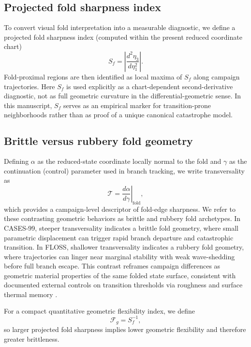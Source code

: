 \documentclass[12pt,a4paper]{article}
\begin{document}
\subsection{Projected fold sharpness index}

To convert visual fold interpretation into a measurable diagnostic, we define a projected fold sharpness index (computed within the present reduced coordinate chart)
\begin{equation}
S_f = \left|\frac{d^2\eta_3}{d\eta_1^2}\right|.
\end{equation}
Fold-proximal regions are then identified as local maxima of $S_f$ along campaign trajectories. Here $S_f$ is used explicitly as a chart-dependent second-derivative diagnostic, not as full geometric curvature in the differential-geometric sense. In this manuscript, $S_f$ serves as an empirical marker for transition-prone neighborhoods rather than as proof of a unique canonical catastrophe model.

\subsection{Brittle versus rubbery fold geometry}

Defining $\alpha$ as the reduced-state coordinate locally normal to the fold and $\gamma$ as the continuation (control) parameter used in branch tracking, we write transversality as
\begin{equation}
\mathcal{T} = \left.\frac{d\alpha}{d\gamma}\right|_{\mathrm{fold}},
\end{equation}
which provides a campaign-level descriptor of fold-edge sharpness. We refer to these contrasting geometric behaviors as brittle and rubbery fold archetypes. In CASES-99, steeper transversality indicates a brittle fold geometry, where small parametric displacement can trigger rapid branch departure and catastrophic transition. In FLOSS, shallower transversality indicates a rubbery fold geometry, where trajectories can linger near marginal stability with weak wave-shedding before full branch escape. This contrast reframes campaign differences as geometric material properties of the same folded state surface, consistent with documented external controls on transition thresholds via roughness and surface thermal memory \citep{acevedo2021external}.

For a compact quantitative geometric flexibility index, we define
\begin{equation}
\mathcal{F}_g = S_f^{-1},
\end{equation}
so larger projected fold sharpness implies lower geometric flexibility and therefore greater brittleness.
\end{document}
